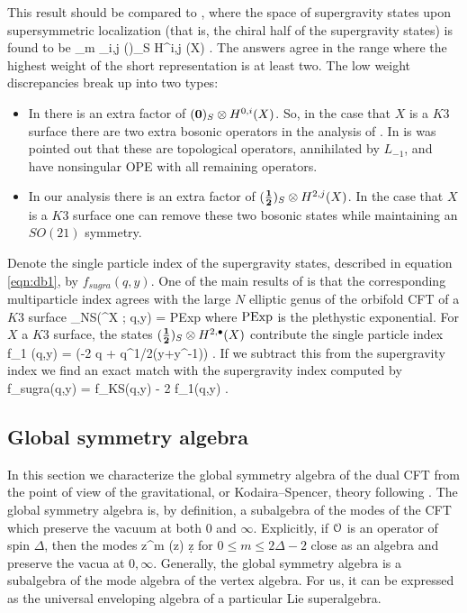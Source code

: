\documentclass[../main.tex]{subfiles}
\begin{document}
This result should be compared to \cite{dB1}, where the space of supergravity states upon supersymmetric localization (that is, the chiral half of the supergravity states) is found to be
\beqn\label{eqn:db1}
\bigoplus_{m } \bigoplus_{i,j} ()_S \otimes H^{i,j} (X) .
\eeqn
The answers agree in the range where the highest weight of the short representation is at least two. 
The low weight discrepancies break up into two types:
\begin{itemize}
\item In \cite{dB1} there is an extra factor of $({\bf 0})_S \otimes H^{0,i}(X)$. 
So, in the case that $X$ is a $K3$ surface there are two extra bosonic operators in the analysis of \cite{dB1}. 
In \cite{CP} is was pointed out that these are topological operators, annihilated by $L_{-1}$, and have nonsingular OPE with all remaining operators. 
\item 
In our analysis there is an extra factor of $(\frac{\bf 1}{\bf 2})_S \otimes H^{2,j}(X)$. 
In the case that $X$ is a $K3$ surface one can remove these two bosonic states while maintaining an $SO(21)$ symmetry. 
\end{itemize}

Denote the single particle index of the supergravity states, described in equation \eqref{eqn:db1}, by $f_{sugra}(q,y)$. 
One of the main results of \cite{dB1} is that the corresponding multiparticle index agrees with the large $N$ elliptic genus of the orbifold CFT of a $K3$ surface
\beqn
\chi_{NS}(\Sym^\infty X ; q,y) = {\rm PExp} 
\eeqn
where ${\rm PExp}$ is the plethystic exponential.
For $X$ a $K3$ surface, the states $(\mathbf{\frac12})_S \otimes H^{2,{\bullet}}(X)$ contribute the single particle index
 f_1 (q,y) = \left(-2 q + q^{1/2}(y+y^{-1})\right) .
\eeqn
If we subtract this from the supergravity index we find an exact match with the supergravity index computed by \cite{dB1}
\beqn\label{eqn:sugraindex}
f_{sugra}(q,y) = f_{KS}(q,y) - 2 f_1(q,y) .
\eeqn

\subsection{Global symmetry algebra}

In this section we characterize the global symmetry algebra of the dual CFT from the point of view of the gravitational, or Kodaira--Spencer, theory following \cite{CP,CGhol}.
The global symmetry algebra is, by definition, a subalgebra of the modes of the CFT which preserve the vacuum at both $0$ and $\infty$.
Explicitly, if $\mathcal O$ is an operator of spin $\Delta$, then the modes
\beqn
\oint z^m \cO(z) \d z
\eeqn
for $0 \leq m \leq 2 \Delta - 2$ close as an algebra and preserve the vacua at $0,\infty$.
Generally, the global symmetry algebra is a subalgebra of the mode algebra of the vertex algebra.
For us, it can be expressed as the universal enveloping algebra of a particular Lie superalgebra.
\end{document}
